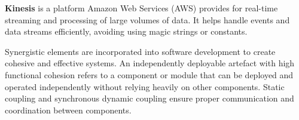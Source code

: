 \documentclass[main.tex]{subfiles}
\begin{document}
\textbf{Kinesis} is a platform Amazon Web Services (AWS) provides for real-time streaming and processing of large volumes of data. It helps handle events and data streams efficiently, avoiding using magic strings or constants.

Synergistic elements are incorporated into software development to create cohesive and effective systems.  
An independently deployable artefact with high functional cohesion refers to a component or module that can be deployed and operated independently without relying heavily on other components. Static coupling and synchronous dynamic coupling ensure proper communication and coordination between components.
\end{document}
